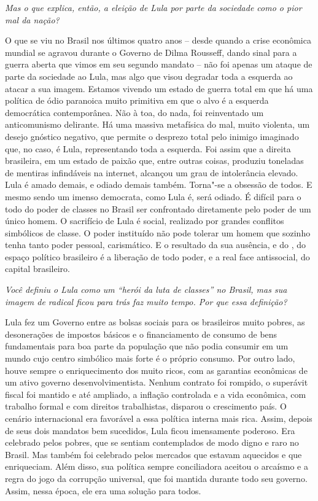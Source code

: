 \medskip

\noindent\emph{Mas o que explica, então, a eleição de Lula por parte da sociedade como
o pior mal da nação?}

\noindent O que se viu no Brasil nos últimos quatro anos -- desde quando a crise
econômica mundial se agravou durante o Governo de Dilma Rousseff, dando
sinal para a guerra aberta que vimos em seu segundo mandato -- não foi
apenas um ataque de parte da sociedade ao Lula, mas algo que visou
degradar toda a esquerda ao atacar a sua imagem. Estamos vivendo um
estado de guerra total em que há uma política de ódio paranoica muito
primitiva em que o alvo é a esquerda democrática contemporânea. Não à
toa, do nada, foi reinventado um anticomunismo delirante. Há uma massiva
metafísica do mal, muito violenta, um desejo gnóstico negativo, que
permite o desprezo total pelo inimigo imaginado que, no caso, é Lula,
representando toda a esquerda. Foi assim que a direita brasileira, em um
estado de paixão que, entre outras coisas, produziu toneladas de
mentiras infindáveis na internet, alcançou um grau de intolerância
elevado. Lula é amado demais, e odiado demais também. Torna"-se a
obsessão de todos. E mesmo sendo um imenso democrata, como Lula é, será
odiado. É difícil para o todo do poder de classes no Brasil ser
confrontado diretamente pelo poder de um único homem. O sacrifício de
Lula é social, realizado por grandes conflitos simbólicos de classe. O
poder instituído não pode tolerar um homem que sozinho tenha tanto poder
pessoal, carismático. E o resultado da sua ausência, e do , do espaço
político brasileiro é a liberação de todo poder, e a real face
antissocial, do capital brasileiro.

\medskip

\noindent\emph{Você definiu o Lula como um ``herói da luta de classes'' no Brasil, mas
sua imagem de radical ficou para trás faz muito tempo. Por que essa
definição?}

\noindent Lula fez um Governo entre as bolsas sociais para os brasileiros muito
pobres, as desonerações de impostos básicos e o financiamento de consumo
de bens fundamentais para boa parte da população que não podia consumir
em um mundo cujo centro simbólico mais forte é o próprio consumo. Por
outro lado, houve sempre o enriquecimento dos muito ricos, com as
garantias econômicas de um ativo governo desenvolvimentista. Nenhum
contrato foi rompido, o superávit fiscal foi mantido e até ampliado, a
inflação controlada e a vida econômica, com trabalho formal e com
direitos trabalhistas, disparou o crescimento país. O cenário
internacional era favorável a essa política interna mais rica. Assim,
depois de seus dois mandatos bem sucedidos, Lula ficou imensamente
poderoso. Era celebrado pelos pobres, que se sentiam contemplados de
modo digno e raro no Brasil. Mas também foi celebrado pelos mercados que
estavam aquecidos e que enriqueciam. Além disso, sua política sempre
conciliadora aceitou o arcaísmo e a regra do jogo da corrupção
universal, que foi mantida durante todo seu governo. Assim, nessa época,
ele era uma solução para todos.

